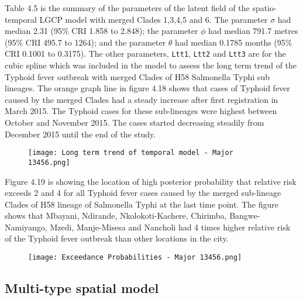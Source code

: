 \documentclass[a4paper]{thesis}
\begin{document}
Table 4.5 is the summary of the parameters of the latent field of the spatio-temporal LGCP model with merged Clades 1,3,4,5 and 6. The parameter $\sigma$ had median 2.31 (95\% CRI 1.858 to 2.848); the parameter $\phi$ had median 791.7 metres (95\% CRI 495.7 to 1264); and the parameter $\theta$ had median 0.1785 months (95\% CRI 0.1001 to 0.3175). The other parameters, \verb=Ltt1=, \verb=Ltt2= and \verb=Ltt3= are for the cubic spline which was included in the model to assess the long term trend of the Typhoid fever outbreak with merged Clades of H58 Salmonella Typhi sub\- lineages. The orange graph line in figure 4.18 shows that cases of Typhoid fever caused by the merged Clades had a steady increase after first registration in March 2015. The Typhoid cases for these sub-lineages were highest between October and November 2015. The cases started decreasing steadily from December 2015 until the end of the study.

\begin{figure}[H]
\begin{center}
\texttt{[image: Long term trend of temporal model - Major 13456.png]}
\end{center}
\end{figure}

Figure 4.19 is showing the location of high posterior probability that relative risk exceeds 2 and 4 for all Typhoid fever cases caused by the merged sub-lineage Clades of H58 lineage of Salmonella Typhi at the last time point. The figure shows that Mbayani, Ndirande, Nkolokoti-Kachere, Chirimba, Bangwe-Namiyango, Mzedi, Manje-Misesa and Nancholi had 4 times higher relative risk of the Typhoid fever outbreak than other locations in the city.

\begin{figure}[H]
\begin{center}
\texttt{[image: Exceedance Probabilities - Major 13456.png]}
\end{center}
\end{figure}

\subsection{Multi-type spatial model}
\end{document}
